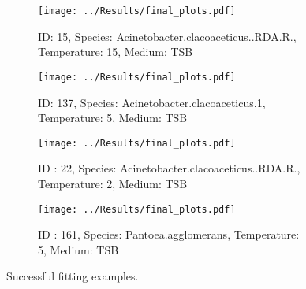 \begin{figure}[H] %
  \centering
    \begin{subfigure}[h]{0.4\textwidth}
        \texttt{[image: ../Results/final\_plots.pdf]}
        \caption{ID: 15, Species: Acinetobacter.clacoaceticus..RDA.R., Temperature: 15, Medium: TSB}
        \label{fig:59}
    \end{subfigure}
    \hfill
    \begin{subfigure}[h]{0.4\textwidth}
        \texttt{[image: ../Results/final\_plots.pdf]}
        \caption{ID: 137, Species: Acinetobacter.clacoaceticus.1, Temperature: 5, Medium: TSB}
        \label{fig:71}
    \end{subfigure}
    \hfill
    \begin{subfigure}[h]{0.4\textwidth}
    \texttt{[image: ../Results/final\_plots.pdf]}
    \caption{ID : 22, Species: Acinetobacter.clacoaceticus..RDA.R., Temperature: 2, Medium: TSB}
    \label{fig:130}
    \end{subfigure}
    \hfill
    \begin{subfigure}[h]{0.4\textwidth}
    \texttt{[image: ../Results/final\_plots.pdf]}
    \caption{ID : 161, Species: Pantoea.agglomerans, Temperature: 5, Medium: TSB}
    \label{fig:130}
    \end{subfigure}
    \hfill
  \caption{Successful fitting examples.}
  \label{fig:Success} 
\end{figure}

